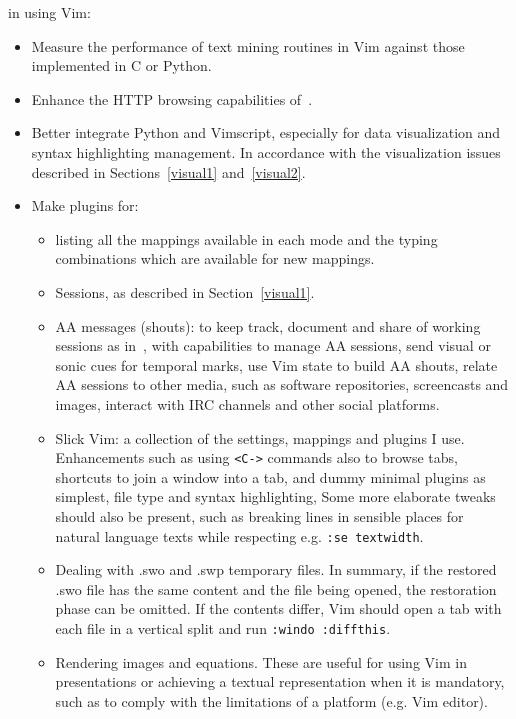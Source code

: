 \documentclass{article}
\newcommand{\ttt}[1] {
	\texttt{<#1>}}
\newcommand{\tttt}[1] {
	\texttt{#1}}
\begin{document}
 in using Vim:
\begin{itemize}
  \item Measure the performance of text mining routines in Vim against those implemented in C or Python.
  \item Enhance the HTTP browsing capabilities of~\cite{vimrc}.
  \item Better integrate Python and Vimscript, especially for data visualization
    and syntax highlighting management.
    In accordance with the visualization issues described in
    Sections~\ref{visual1} and~\ref{visual2}.
  \item Make plugins for:
    \begin{itemize}
      \item listing all the mappings available in each mode and the typing combinations which are available
        for new mappings.
      \item Sessions, as described in Section~\ref{visual1}.
      \item AA messages (shouts): to keep track, document and share of working sessions
        as in~\cite{aa1,aa2}, with capabilities to manage AA sessions,
        send visual or sonic cues for temporal marks, use Vim state to build AA shouts,
        relate AA sessions to other media, such as software repositories,
        screencasts and images, interact with IRC channels and other social platforms.
      \item Slick Vim: a collection of the settings, mappings and plugins I use.
        Enhancements such as using \ttt{C-} commands also to browse tabs,
        shortcuts to join a window into a tab,
        and dummy minimal plugins as simplest, file type and syntax highlighting,
        Some more elaborate tweaks should also be present, such
        as breaking lines in sensible places for natural language texts
        while respecting e.g. \tttt{:se textwidth}.
      \item Dealing with .swo and .swp temporary files.
        In summary, if the restored .swo file has the same content
        and the file being opened,
        the restoration phase can be omitted.
        If the contents differ, Vim should open a tab with each file
        in a vertical split and run \tttt{:windo :diffthis}.
      \item Rendering images and equations.
        These are useful for using Vim in presentations
        or achieving a textual representation when it is mandatory,
        such as to comply with the limitations of a platform (e.g. Vim editor). 

\end{itemize}
\end{itemize}
\end{document}
